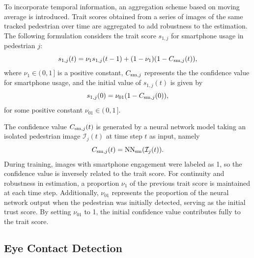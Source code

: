 \documentclass[journal]{IEEEtran}
\begin{document}
To incorporate temporal information, an aggregation scheme based on moving average is introduced. Trait scores obtained from a series of images of the same tracked pedestrian over time are aggregated to add robustness to the estimation. The following formulation considers the trait score $s_{1,j}$ for smartphone usage in pedestrian $j$:
\begin{equation}
    s_{1,j}(t) = \nu_1s_{1,j}(t-1) + (1-\nu_1)(1 - {C}_{{\rm sm},j}(t)),
\label{smato_score}
\end{equation}
where $\nu_1\in (\,0,1\,]$ is a positive constant, ${C}_{{\rm sm},j}$ represents the the confidence value for smartphone usage, and the initial value of $s_{1,j}(t)$ is given by 
\begin{equation*}
    s_{1,j}(0) = \nu_{01}(1 - {C}_{{\rm sm},j}(0)),
\end{equation*}
for some positive constant $\nu_{01} \in (\,0,1\,]$.

The confidence value ${C}_{{\rm sm},j}(t)$ is generated by a neural network model taking an isolated pedestrian image $\mathcal{I}_{j}(t)$ at time step $t$ as input, namely
\begin{equation*}
{C}_{{\rm sm},j}(t) = {\rm NN}_{\rm sm}(\mathcal{I}_{j}(t)).
\end{equation*}
%
During training, images with smartphone engagement were labeled as 1, so the confidence value is inversely related to the trait score. For continuity and robustness in estimation, a proportion $\nu_{1}$ of the previous trait score is maintained at each time step. Additionally, $\nu_{01}$ represents the proportion of the neural network output when the pedestrian was initially detected, serving as the initial trust score. By setting $\nu_{01}$ to 1, the initial confidence value contributes fully to the trait score.

\subsection{Eye Contact Detection}
\end{document}
